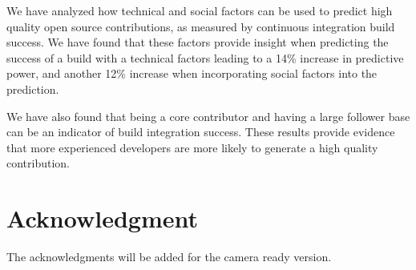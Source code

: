 \documentclass[10pt, conference]{IEEEtran}
\begin{document}
We have analyzed how technical and social factors can be used to
predict high quality open source contributions, as measured by continuous
integration build success.  We have found that these factors provide
insight when predicting the success of a build with a technical factors leading
to a 14\% increase in predictive power, and another 12\% increase when
incorporating social factors into the prediction.

We have also found that being a core contributor and having a large follower
base can be an indicator of build integration success.
These results provide evidence that more experienced
developers are more likely to generate a high quality contribution.


\section*{Acknowledgment}

The acknowledgments will be added for the camera ready version.




%
%
%

 




\end{document}

